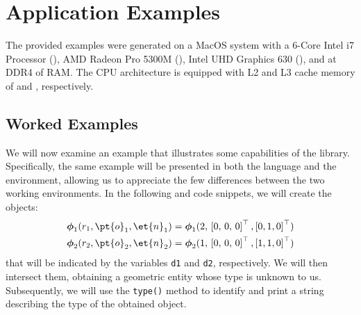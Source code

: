 
\section{Application Examples}
\label{app1:acme_example}

The provided examples were generated on a MacOS system with a 6-Core Intel i7 Processor (), AMD Radeon Pro 5300M (), Intel \ac{UHD} Graphics 630 (), and  at  DDR4 of \ac{RAM}. The \ac{CPU} architecture is equipped with L2 and L3 cache memory of  and , respectively.

\subsection{Worked Examples}
We will now examine an example that illustrates some capabilities of the \Acme{} library. Specifically, the same example will be presented in both the \cpp{} language and the \Matlab{} environment, allowing us to appreciate the few differences between the two working environments. In the following \cpp{} and \Matlab{} code snippets, we will create the \Disk{} objects:
%
\begin{equation*}
\begin{split}
\boldsymbol{\phi}_1(r_1, \pt{o}_1, \et{n}_1) = \boldsymbol{\phi}_1(2, \, \left[0, \, 0, \, 0\right]^{\top}, \left[0,1,0\right]^{\top}) \\
\boldsymbol{\phi}_2(r_2, \pt{o}_2, \et{n}_2) = \boldsymbol{\phi}_2(1, \, \left[0, \, 0, \, 0\right]^{\top}, \left[1,1,0\right]^{\top})
\end{split}
\end{equation*}
%
that will be indicated by the variables \texttt{d1} and \texttt{d2}, respectively. We will then intersect them, obtaining a geometric entity whose type is unknown to us. Subsequently, we will use the \texttt{type()} method to identify and print a string describing the type of the obtained \Entity{} object. \\[0.5em]

